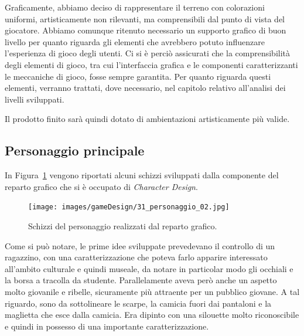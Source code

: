 Graficamente, abbiamo deciso di rappresentare il terreno con colorazioni uniformi, artisticamente non rilevanti, ma comprensibili dal punto di vista del giocatore.
Abbiamo comunque ritenuto necessario un supporto grafico di buon livello per quanto riguarda gli elementi che avrebbero potuto influenzare l’esperienza di gioco degli utenti. Ci si è perciò assicurati che la comprensibilità degli elementi di gioco, tra cui l’interfaccia grafica e le componenti caratterizzanti le meccaniche di gioco, fosse sempre garantita.
Per quanto riguarda questi elementi, verranno trattati, dove necessario, nel capitolo relativo all’analisi dei livelli sviluppati.

Il prodotto finito sarà quindi dotato di ambientazioni artisticamente più valide.


\subsection{Personaggio principale}
\label{sec:main_character}

In Figura~\ref{fig:ambientazione_personaggio_01} vengono riportati alcuni schizzi sviluppati dalla componente del reparto grafico che si è occupato di \textit{Character Design}.

\begin{figure}%
	\centering
	\texttt{[image: images/gameDesign/31\_personaggio\_02.jpg]}
	\caption{Schizzi del personaggio realizzati dal reparto grafico.}
	\label{fig:ambientazione_personaggio_01}
\end{figure} 

Come si può notare, le prime idee sviluppate prevedevano il controllo di un ragazzino, con una caratterizzazione che poteva farlo apparire interessato all’ambito culturale e quindi museale, da notare in particolar modo gli occhiali e la borsa a tracolla da studente. Parallelamente aveva però anche un aspetto molto giovanile e ribelle, sicuramente più attraente per un pubblico giovane. A tal riguardo, sono da sottolineare le scarpe, la camicia fuori dai pantaloni e la maglietta che esce dalla camicia.
Era dipinto con una silouette molto riconoscibile e quindi in possesso di una importante caratterizzazione.

